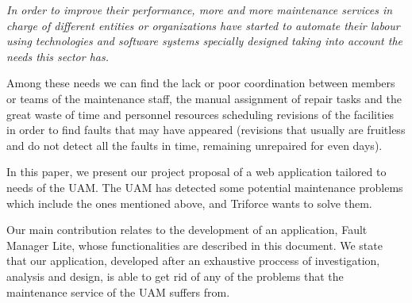 
\itshape
In order to improve their performance, more and more maintenance services in charge of different entities or organizations have started to automate their labour using technologies and software systems specially designed taking into account the needs this sector has.

Among these needs we can find the lack or poor coordination between members or teams of the maintenance staff, the manual assignment of repair tasks and the great waste of time and personnel resources scheduling revisions of the facilities in order to find faults that may have appeared (revisions that usually are fruitless and do not detect all the faults in time, remaining unrepaired for even days).

In this paper, we present our project proposal of a web application tailored to needs of the UAM. The UAM has detected some potential maintenance problems which include the ones mentioned above, and Triforce wants to solve them.

Our main contribution relates to the development of an application, Fault Manager Lite, whose functionalities are described in this document. We state that our application, developed after an exhaustive proccess of investigation, analysis and design, is able to get rid of any of the problems that the maintenance service of the UAM suffers from.

\upshape
